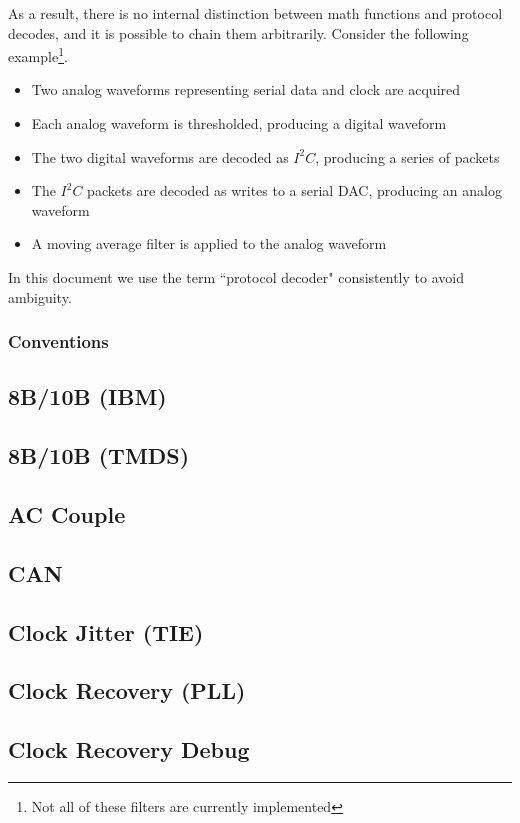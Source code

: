 \documentclass[11pt]{article}
\begin{document}
As a result, there is no internal distinction between math functions and protocol decodes, and it is possible to chain
them arbitrarily. Consider the following example\footnote{Not all of these filters are currently implemented}.

\begin{itemize}
\item Two analog waveforms representing serial data and clock are acquired
\item Each analog waveform is thresholded, producing a digital waveform
\item The two digital waveforms are decoded as $I^2C$, producing a series of packets
\item The $I^2C$ packets are decoded as writes to a serial DAC, producing an analog waveform
\item A moving average filter is applied to the analog waveform
\end{itemize}

In this document we use the term ``protocol decoder" consistently to avoid ambiguity.

\subsubsection{Conventions}

\subsection{8B/10B (IBM)}
\subsection{8B/10B (TMDS)}
\subsection{AC Couple}
\subsection{CAN}
\subsection{Clock Jitter (TIE)}
\subsection{Clock Recovery (PLL)}
\subsection{Clock Recovery Debug}
\end{document}
